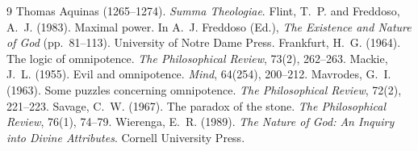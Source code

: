 \documentclass{situationist-preprint}
\begin{document}
\begin{thebibliography}{9}\small
{} Thomas Aquinas (1265--1274). \emph{Summa Theologiae}.
 Flint, T.~P. and Freddoso, A.~J. (1983). Maximal power. In A.~J. Freddoso (Ed.), \emph{The Existence and Nature of God} (pp.~81--113). University of Notre Dame Press.
 Frankfurt, H.~G. (1964). The logic of omnipotence. \emph{The Philosophical Review}, 73(2), 262--263.
 Mackie, J.~L. (1955). Evil and omnipotence. \emph{Mind}, 64(254), 200--212.
 Mavrodes, G.~I. (1963). Some puzzles concerning omnipotence. \emph{The Philosophical Review}, 72(2), 221--223.
 Savage, C.~W. (1967). The paradox of the stone. \emph{The Philosophical Review}, 76(1), 74--79.
 Wierenga, E.~R. (1989). \emph{The Nature of God: An Inquiry into Divine Attributes}. Cornell University Press.
\end{thebibliography}
\end{document}
